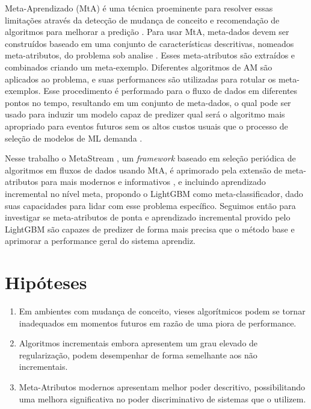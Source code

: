 Meta-Aprendizado (MtA) é uma técnica proeminente para resolver essas limitações
através da detecção de mudança de conceito e recomendação de algoritmos para
melhorar a predição \cite{Anderson2019,VanRijn2016,Zarmehri2015}. Para usar
MtA, meta-dados devem ser construídos \cite{Vanschoren2018} baseado em uma
conjunto de características descritivas, nomeados meta-atributos, do problema
sob analise \cite{Rivolli2018}. Esses meta-atributos são extraídos e combinados
criando um meta-exemplo. Diferentes algoritmos de AM são aplicados ao problema,
e suas performances são utilizadas para rotular os meta-exemplos. Esse
procedimento é performado para o fluxo de dados em diferentes pontos no tempo,
resultando em um conjunto de meta-dados, o qual pode ser usado para induzir um
modelo capaz de predizer qual será o algoritmo mais apropriado para eventos
futuros sem os altos custos usuais que o processo de seleção de modelos de ML
demanda \cite{Munoz2018}.

Nesse trabalho o MetaStream \cite{rossi2012, rossi2014metastream}, um
\textit{framework} baseado em seleção periódica de algoritmos em fluxos de
dados usando MtA, é aprimorado pela extensão de meta-atributos para mais
modernos e informativos \cite{Rivolli2018}, e incluindo aprendizado incremental
no nível meta, propondo o  LightGBM \cite{ke2017lightgbm} como
meta-classificador, dado suas capacidades para lidar com esse problema
específico. Seguimos então para investigar se meta-atributos de ponta e
aprendizado incremental provido pelo LightGBM são capazes de predizer de forma
mais precisa que o método base e aprimorar a performance geral do sistema
aprendiz.


\section{Hipóteses}

\begin{enumerate}
    \item Em ambientes com mudança de conceito, vieses algorítmicos podem se tornar
        inadequados em momentos futuros em razão de uma piora de performance.
    \item Algoritmos incrementais embora apresentem um grau elevado de regularização,
        podem desempenhar de forma semelhante aos não incrementais.
    \item Meta-Atributos modernos apresentam melhor poder descritivo,
        possibilitando uma melhora significativa no poder discriminativo de sistemas
        que o utilizem.
\end{enumerate}

